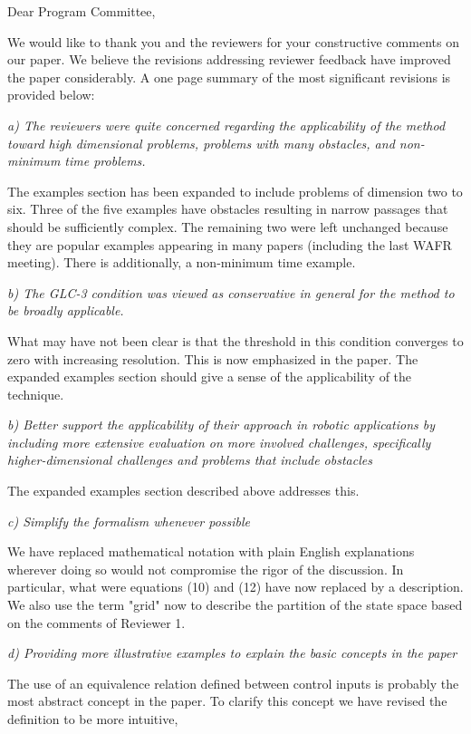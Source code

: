 \documentclass{letter}
\date{}
\begin{document}
	\begin{letter}{}
		\opening{Dear Program Committee,}
		We would like to thank you and the reviewers for your constructive comments on our paper. We believe the revisions addressing reviewer feedback have improved the paper considerably. A one page summary of the most significant revisions is provided below:
		
		\emph{a) The reviewers were quite concerned regarding the
		applicability of the method toward high dimensional problems, problems with many obstacles, and non-minimum time problems.}
		
		The examples section has been expanded to include problems of dimension two to six. Three of the five examples have obstacles resulting in narrow passages that should be sufficiently complex. The remaining two were left unchanged because they are popular examples appearing in many papers (including the last WAFR meeting). There is additionally, a non-minimum time example.
		
		\emph{b) The GLC-3 condition was viewed as conservative in general for the method to be broadly applicable.}
		
		What may have not been clear is that the threshold in this condition converges to zero with increasing resolution. This is now emphasized in the paper. The expanded examples section should give a sense of the applicability of the technique.
		
		\emph{b) Better support the applicability of their approach in robotic applications by including more extensive evaluation on more involved challenges, specifically higher-dimensional challenges and problems that include obstacles}
		
		The expanded examples section described above addresses this.
		
		\emph{c) Simplify the formalism whenever possible}
		
		We have replaced mathematical notation with plain English explanations wherever doing so would not compromise the rigor of the discussion. In particular, what were equations (10) and (12) have now replaced by a description. We also use the term "grid" now to describe the partition of the state space based on the comments of Reviewer 1.
		
		\emph{d) Providing more illustrative examples to explain the basic concepts in the paper}
		
		The use of an equivalence relation defined between control inputs is probably the most abstract concept in the paper. To clarify this concept we have revised the definition to be more intuitive, 
		

\end{letter}
\end{document}

